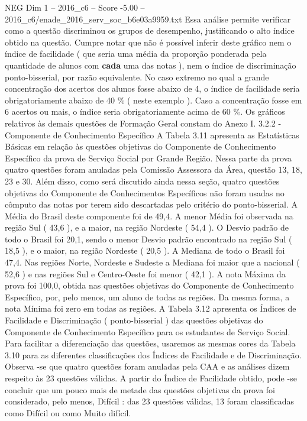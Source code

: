 \begin{textsample}{NEG Dim 1 – 2016\_c6 – Score -5.00 – 2016\_c6/enade\_2016\_serv\_soc\_b6e03a9959.txt}
Essa análise permite verificar como a questão discriminou os grupos de desempenho, justificando o alto índice obtido na questão.
Cumpre notar que não é possível inferir deste gráfico nem o índice de facilidade ( que seria uma média da proporção ponderada pela quantidade de alunos com \textbf{cada} uma das notas ), nem o índice de discriminação ponto-bisserial, por razão equivalente.
No caso extremo no qual a grande concentração dos acertos dos alunos fosse abaixo de 4, o índice de facilidade seria obrigatoriamente abaixo de 40 \% ( neste exemplo ).
Caso a concentração fosse em 6 acertos ou mais, o índice seria obrigatoriamente acima de 60 \%.
Os gráficos relativos às demais questões de Formação Geral constam do Anexo I. 3.2.2 - Componente de Conhecimento Específico A Tabela 3.11 apresenta as Estatísticas Básicas em relação às questões objetivas do Componente de Conhecimento Específico da prova de Serviço Social por Grande Região.
Nessa parte da prova quatro questões foram anuladas pela Comissão Assessora da Área, questão 13, 18, 23 e 30.
Além disso, como será discutido ainda nessa seção, quatro questões objetivas do Componente de Conhecimentos Específicos não foram usadas no cômputo das notas por terem sido descartadas pelo critério do ponto-bisserial.
A Média do Brasil deste componente foi de 49,4.
A menor Média foi observada na região Sul ( 43,6 ), e a maior, na região Nordeste ( 54,4 ).
O Desvio padrão de todo o Brasil foi 20,1, sendo o menor Desvio padrão encontrado na região Sul ( 18,5 ), e o maior, na região Nordeste ( 20,5 ).
A Mediana de todo o Brasil foi 47,4.
Nas regiões Norte, Nordeste e Sudeste a Mediana foi maior que a nacional ( 52,6 ) e nas regiões Sul e Centro-Oeste foi menor ( 42,1 ).
A nota Máxima da prova foi 100,0, obtida nas questões objetivas do Componente de Conhecimento Específico, por, pelo menos, um aluno de todas as regiões.
Da mesma forma, a nota Mínima foi zero em todas as regiões.
A Tabela 3.12 apresenta os Índices de Facilidade e Discriminação ( ponto-bisserial ) das questões objetivas do Componente de Conhecimento Específico para os estudantes de Serviço Social.
Para facilitar a diferenciação das questões, usaremos as mesmas cores da Tabela 3.10 para as diferentes classificações dos Índices de Facilidade e de Discriminação.
Observa -se que quatro questões foram anuladas pela CAA e as análises dizem respeito às 23 questões válidas.
A partir do Índice de Facilidade obtido, pode -se concluir que um pouco mais de metade das questões objetivas da prova foi considerado, pelo menos, Difícil : das 23 questões válidas, 13 foram classificadas como Difícil ou como Muito difícil.

\end{textsample}
